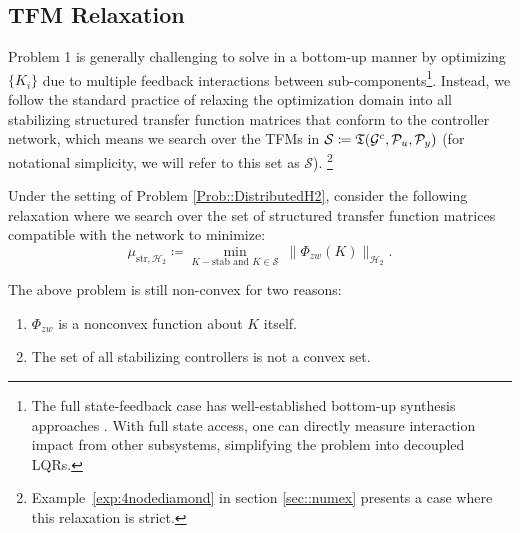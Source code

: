 \subsection{TFM Relaxation}
Problem 1 is generally challenging to solve in a bottom-up manner by optimizing \(\{K_i\}\) due to multiple feedback interactions between sub-components\footnote{
The full state-feedback case has well-established bottom-up synthesis approaches \cite{Lamperski2015StateFB, Shah2013Posets}. With full state access, one can directly measure interaction impact from other subsystems, simplifying the problem into decoupled LQRs.
}.
Instead, we follow the standard practice of relaxing the optimization domain into all stabilizing structured transfer function matrices that conform to the controller network, which means we search over the TFMs in \({\cal S}\coloneqq \mathfrak{T}(\mathcal{G}^c,\mathcal{P}_{u},\mathcal{P}_y)\)
(for notational simplicity, we will refer to this set as \(\mathcal{S}\)).
\footnote{Example~\ref{exp:4nodediamond} in section \ref{sec::numex} presents a case where this relaxation is strict.}
\begin{opt}\label{Prob::networkoptcontrol}
Under the setting of Problem \ref{Prob::DistributedH2}, consider the following relaxation where we search over the set of structured transfer function matrices compatible with the network to minimize:
\begin{equation}
    \mu_{\mathrm{str}, \mathcal{H}_2} \coloneqq \underset{K - \text{stab and } K\in \mathcal{S}}{\min}\ \|\Phi_{zw}(K)\|_{\mathcal{H}_2}.
\end{equation}
\end{opt}
The above problem is still non-convex for two reasons: 
\begin{enumerate}
    \item \(\Phi_{zw}\) is a nonconvex function about \(K\) itself.
    \item The set of all stabilizing controllers is not a convex set.
\end{enumerate}

